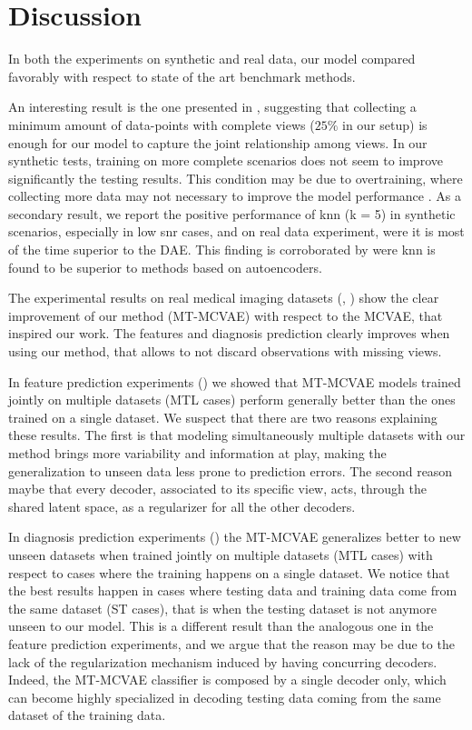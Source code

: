 \section{Discussion}

In both the experiments on synthetic and real data, our model compared favorably with respect to state of the art benchmark methods.

An interesting result is the one presented in , suggesting that collecting a minimum amount of data-points with complete views ($25\%$ in our setup) is enough for our model to capture the joint relationship among views.
In our synthetic tests, training on more complete scenarios does not seem to improve significantly the testing results.
This condition may be due to overtraining, where collecting more data may not necessary to improve the model performance \citep{Bilbao2017}.
As a secondary result, we report the positive performance of knn (k = 5) in synthetic scenarios, especially in low snr cases, and on real data experiment, were it is most of the time superior to the DAE.
This finding is corroborated by \cite{Platias2020} were knn is found to be superior to methods based on autoencoders.

The experimental results on real medical imaging datasets (, ) show the clear improvement of our method (MT-MCVAE) with respect to the MCVAE, that inspired our work.
The features and diagnosis prediction clearly improves when using our method, that allows to not discard observations with missing views.

In feature prediction experiments () we showed that MT-MCVAE models trained jointly on multiple datasets (MTL cases) perform generally better than the ones trained on a single dataset.
We suspect that there are two reasons explaining these results.
The first is that modeling simultaneously multiple datasets with our method brings more variability and information at play, making the generalization to unseen data less prone to prediction errors.
The second reason maybe that every decoder, associated to its specific view, acts, through the shared latent space, as a regularizer for all the other decoders.

In diagnosis prediction experiments () the MT-MCVAE generalizes better to new unseen datasets when trained jointly on multiple datasets (MTL cases) with respect to cases where the training happens on a single dataset.
We notice that the best results happen in cases where testing data and training data come from the same dataset (ST cases), that is when the testing dataset is not anymore unseen to our model.
This is a different result than the analogous one in the feature prediction experiments, and we argue that the reason may be due to the lack of the regularization mechanism induced by having concurring decoders.
Indeed, the MT-MCVAE classifier is composed by a single decoder only, which can become highly specialized in decoding testing data coming from the same dataset of the training data.

